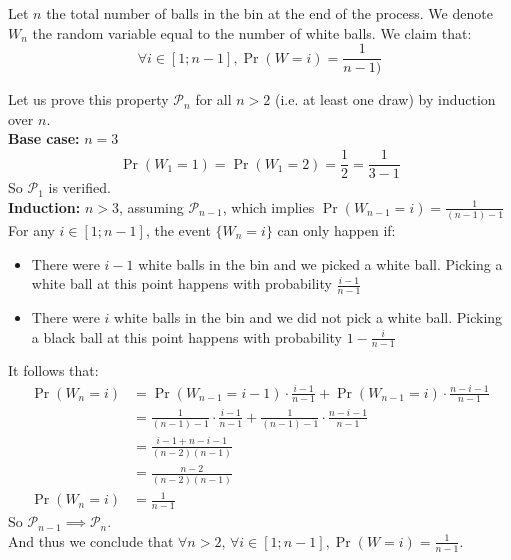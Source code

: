 \providecommand{\f}[2]{\ensuremath{\frac{#1}{#2}}}

Let $n$ the total number of balls in the bin at the end of the process. We denote $W_n$ the random variable equal to the number of white balls. We claim that:
\[
  \forall i \in [1; n-1], \Pr(W = i) = \f{1}{n - 1)}
\]

Let us prove this property $\mathcal{P}_n$ for all $n > 2$ (i.e. at least one draw) by induction over $n$.\\

\noindent
\textbf{Base case:} $n = 3$\\
\[
    \Pr(W_1 = 1) = \Pr(W_1 = 2) = \f{1}{2} = \f{1}{3 - 1}
\]
So $\mathcal{P}_1$ is verified.\\

\noindent
\textbf{Induction:} $n > 3$, assuming $\mathcal{P}_{n-1}$, which implies $\Pr(W_{n-1} = i) = \f{1}{(n - 1) - 1}$\\
For any $i \in [1; n-1]$, the event $\{W_n = i\}$ can only happen if:
\begin{itemize}
  \item There were $i - 1$ white balls in the bin and we picked a white ball. Picking a white ball at this point happens with probability $\f{i - 1}{n - 1}$
  \item There were $i$ white balls in the bin and we did not pick a white ball. Picking a black ball at this point happens with probability $1 - \f{i}{n - 1}$
\end{itemize}

\noindent
It follows that:
\[
  \begin{array}{ll}
    \Pr(W_n = i) & = \Pr(W_{n-1} = i - 1) \cdot \f{i - 1}{n - 1} + \Pr(W_{n-1} = i) \cdot \f{n - i - 1}{n - 1} \\
                 & = \f{1}{(n - 1) - 1} \cdot \f{i - 1}{n - 1} + \f{1}{(n - 1) - 1} \cdot \f{n - i - 1}{n - 1} \\
                 & = \f{i - 1 + n - i - 1}{(n - 2)(n-1)} \\
                 & = \f{n - 2}{(n - 2)(n-1)}\\
    \Pr(W_n = i) & = \f{1}{n - 1}
  \end{array}
\]
So $\mathcal{P}_{n-1} \implies \mathcal{P}_{n}$.\\

\noindent
And thus we conclude that $\forall n > 2$, $\forall i \in [1; n-1], \Pr(W = i) = \f{1}{n - 1}$.

